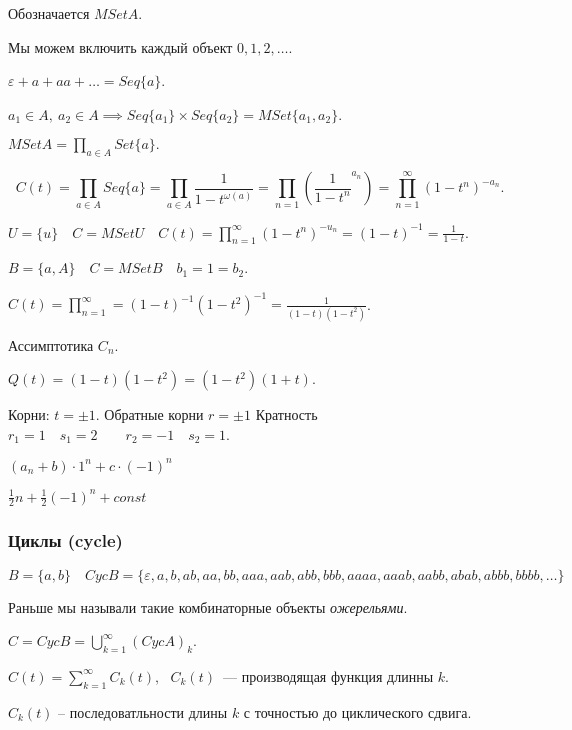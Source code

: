 \begin{definition}[Мультимножество]
    Обозначается $MSet A$. 

    Мы можем включить каждый объект $0, 1, 2, \ldots$.
    
    $\varepsilon + a + aa + \ldots = Seq \{a\}$.

    $a_1 \in A,~ a_2 \in A \implies Seq \{a_1\} \times Seq \{a_2\} = MSet \{ a_1, a_2 \}$. 

    $MSet A = \prod_{a \in A} Set \{a \}.$

    \[ C(t) = \prod_{a\in A} Seq \{a\} = \prod_{a\in A} \frac{1}{1 - t^{\omega(a)}}
    = \prod_{n = 1} \left( \frac{1}{1 - t^n}^{a_n} \right)
    = \prod_{ n =1}^{\infty }(1 - t^n)^{-a_n}
    .\]
\end{definition}

\begin{example}
    $U = \{u\}\quad C = MSet U\quad C(t) = \prod_{n=1}^{\infty } (1 - t^n)^{-u_n} = (1 - t)^{-1} = \frac{1}{1 - t}$.

    $B = \{a, A\}\quad C = MSet B\quad b_1 = 1 = b_2$.

    $C(t) = \prod_{n=1}^{\infty} = (1 - t)^{-1}(1 - t^2)^{-1} = \frac{1}{(1-t)(1- t^2)}$.

    Ассимптотика $C_n$.

    $Q(t) = (1 -t)(1 - t^2) = (1 - t^2)(1+t)$.

    Корни: $t = \pm 1$. Обратные корни $r = \pm 1$ Кратность $r_1 = 1\quad s_1 = 2\qquad r_2 = -1\quad s_2 = 1$.

    $(a_n + b)\cdot 1^n + c \cdot (-1)^n $

    $\frac{1}{2}n + \frac{1}{2}(-1)^n + const$
\end{example}

\subsubsection{Циклы (cycle)}

$B = \{a, b\}\quad Cyc B = \{\varepsilon, a, b, ab, aa, bb, aaa, aab, abb, bbb, aaaa, aaab, aabb, abab, abbb, bbbb, \ldots\}$

Раньше мы называли такие комбинаторные объекты \textit{ожерельями}.

$C = Cyc B = \bigcup_{k = 1}^\infty \left( Cyc A\right)_k$.

$C(t) = \sum_{k=1}^\infty C_k (t),~~~ C_k (t)$~--- производящая функция длинны $k$.

$C_k(t)$ -- последоватльности длины $k$ с точностью до циклического сдвига.


